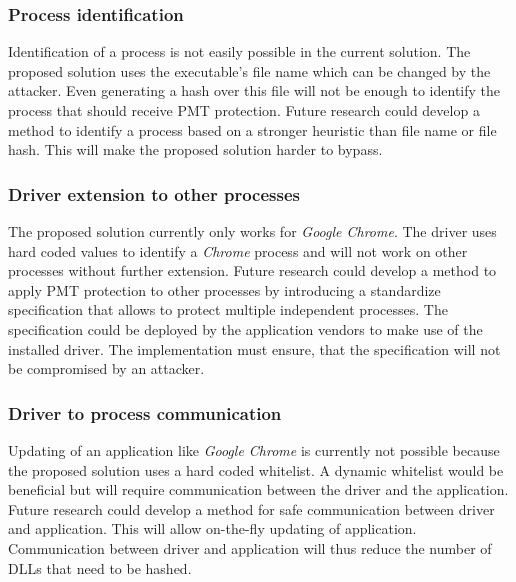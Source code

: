 \subsubsection{Process identification}
Identification of a process is not easily possible in the current solution. The proposed solution uses the executable's file name which can be changed by the attacker. Even generating a hash over this file will not be enough to identify the process that should receive \gls{PMT} protection. Future research could develop a method to identify a process based on a stronger heuristic than file name or file hash. This will make the proposed solution harder to bypass.
\subsubsection{Driver extension to other processes}
The proposed solution currently only works for \emph{Google Chrome}. The driver uses hard coded values to identify a \emph{Chrome} process and will not work on other processes without further extension. Future research could develop a method to apply \gls{PMT} protection to other processes by introducing a standardize specification that allows to protect multiple independent processes. The specification could be deployed by the application vendors to make use of the installed driver. The implementation must ensure, that the specification will not be compromised by an attacker.
\subsubsection{Driver to process communication}
Updating of an application like \emph{Google Chrome} is currently not possible because the proposed solution uses a hard coded whitelist. A dynamic whitelist would be beneficial but will require communication between the driver and the application. Future research could develop a method for safe communication between driver and application. This will allow on-the-fly updating of application. Communication between driver and application will thus reduce the number of \glspl{DLL} that need to be hashed.